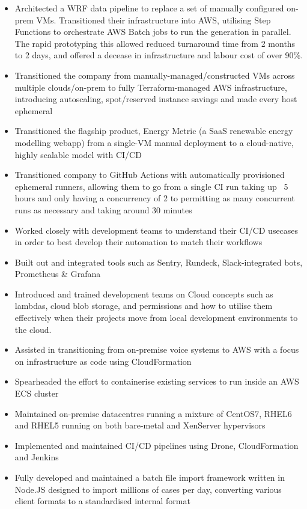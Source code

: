 \documentclass[10pt,a4paper,ragged2e]{altacv}
\begin{document}
\begin{itemize}
  \item Architected a WRF data pipeline to replace a set of manually configured on-prem VMs. Transitioned their infrastructure into AWS, utilising Step Functions to orchestrate AWS Batch jobs to run the generation in parallel. The rapid prototyping this allowed reduced turnaround time from 2 months to 2 days, and offered a decease in infrastructure and labour cost of over 90\%.
  \item Transitioned the company from manually-managed/constructed VMs across multiple clouds/on-prem to fully Terraform-managed AWS infrastructure, introducing autoscaling, spot/reserved instance savings and made every host ephemeral
  \item Transitioned the flagship product, Energy Metric (a SaaS renewable energy modelling webapp) from a single-VM manual deployment to a cloud-native, highly scalable model with CI/CD
  \item Transitioned company to GitHub Actions with automatically provisioned ephemeral runners, allowing them to go from a single CI run taking up ~5 hours and only having a concurrency of 2 to permitting as many concurrent runs as necessary and taking around 30 minutes
  \item Worked closely with development teams to understand their CI/CD usecases in order to best develop their automation to match their workflows
  \item Built out and integrated tools such as Sentry, Rundeck, Slack-integrated bots, Prometheus \& Grafana
  \item Introduced and trained development teams on Cloud concepts such as lambdas, cloud blob storage, and permissions and how to utilise them effectively when their projects move from local development environments to the cloud.
\end{itemize}

\begin{itemize}
\item Assisted in transitioning from on-premise voice systems to AWS with a focus on infrastructure as code using CloudFormation
\item Spearheaded the effort to containerise existing services to run inside an AWS ECS cluster
\item Maintained on-premise datacentres running a mixture of CentOS7, RHEL6 and RHEL5 running on both bare-metal and XenServer hypervisors
\item Implemented and maintained CI/CD pipelines using Drone, CloudFormation and Jenkins
\item Fully developed and maintained a batch file import framework written in Node.JS designed to import millions of cases per day, converting various client formats to a standardised internal format
\end{itemize}
\end{document}
